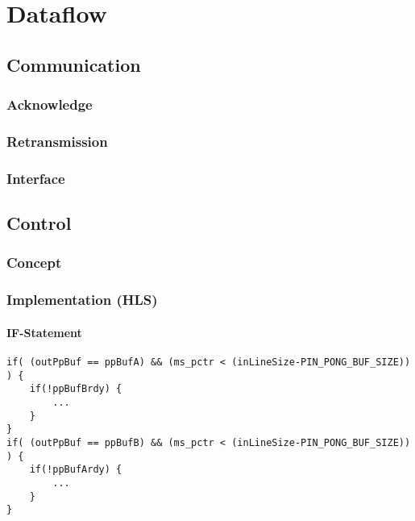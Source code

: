 %
%
\chapter{Dataflow} \label{chapt:dataflow}

\section{Communication}

\subsection{Acknowledge}

\subsection{Retransmission}

\subsection{Interface}

\section{Control}

\subsection{Concept}

\subsection{Implementation (HLS)}


\subsubsection*{IF-Statement} \label{ch:data:if}

\begin{minipage}{\textwidth}
\begin{lstlisting}[style=CStyle, caption=Buffer switching reloading without else statement, label=lst:buf_false]
if( (outPpBuf == ppBufA) && (ms_pctr < (inLineSize-PIN_PONG_BUF_SIZE)) ) {
    if(!ppBufBrdy) {
        ...
    }
}
if( (outPpBuf == ppBufB) && (ms_pctr < (inLineSize-PIN_PONG_BUF_SIZE)) ) {
    if(!ppBufArdy) {
        ...
    }
}
\end{lstlisting}
\end{minipage}

